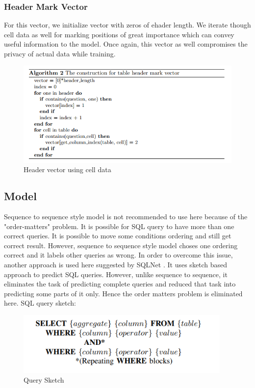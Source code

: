\documentclass[12pt]{article}
\begin{document}
\subsubsection{Header Mark Vector}
For this vector, we initialize vector with zeros of ehader length. We iterate though cell data as well for marking positions of great importance which can convey useful information to the model. Once again, this vector as well compromises the privacy of actual data while training. 

\begin{figure}[H]
    \includegraphics[width=400pt]{headermarkvetorbert}
    \caption{Header vector using cell data}
    \label{headermarkvetorbert1}
\end{figure}


\subsection{Model}
Sequence to sequence style model is not recommended to use here because of the "order-matters" problem. It is possible for SQL query to have more than one correct queries. It is possible to move some conditions ordering and still get correct result. However, sequence to sequence style model choses one ordering correct and it labels other queries as wrong. In order to overcome this issue, another approach is used here suggested by SQLNet \cite{xu2017sqlnet}. It uses sketch based approach to predict SQL queries. However, unlike sequence to sequence, it eliminates the task of predicting complete queries and reduced that task into predicting some parts of it only. Hence the order matters problem is eliminated here. SQL query sketch:
 
\begin{figure}[H]
    \includegraphics[width=300pt]{sketch}
    \caption{Query Sketch}
    \label{fig:Query Sketch}
\end{figure}
\end{document}
